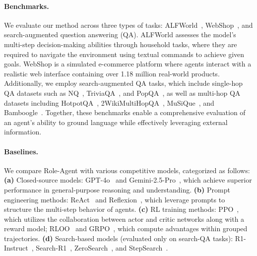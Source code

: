 \documentclass[11pt]{article}
\begin{document}
\paragraph{Benchmarks.} We evaluate our method across three types of tasks: ALFWorld~\cite{shridhar2020alfworld}, WebShop~\cite{yao2022webshop}, and search-augmented question answering (QA). ALFWorld assesses the model's multi-step decision-making abilities through household tasks, where they are required to navigate the environment using textual commands to achieve given goals. WebShop is a simulated e-commerce platform where agents interact with a realistic web interface containing over 1.18 million real-world products. Additionally, we employ search-augmented QA tasks, which include single-hop QA datasets such as NQ~\cite{kwiatkowski2019natural}, TriviaQA~\cite{joshi2017triviaqa}, and PopQA~\cite{mallen2023not}, as well as multi-hop QA datasets including HotpotQA~\cite{yang2018hotpotqa}, 2WikiMultiHopQA~\cite{ho2020constructing}, MuSiQue~\cite{trivedi2022musique}, and Bamboogle~\cite{press2023measuring}. Together, these benchmarks enable a comprehensive evaluation of an agent's ability to ground language while effectively leveraging external information.

\paragraph{Baselines.} We compare Role-Agent with various competitive models, categorized as follows: \textbf{(a)} Closed-source models: GPT-4o~\cite{achiam2023gpt} and Gemini-2.5-Pro~\cite{team2023gemini}, which achieve superior performance in general-purpose reasoning and understanding. \textbf{(b)} Prompt engineering methods: ReAct~\cite{yao2022react} and Reflexion~\cite{shinn2023reflexion}, which leverage prompts to structure the multi-step behavior of agents. \textbf{(c)} RL training methods: PPO~\cite{schulman2017proximal}, which utilizes the collaboration between actor and critic networks along with a reward model; RLOO~\cite{kool2019buy,ahmadian2024back} and GRPO~\cite{guo2025deepseek}, which compute advantages within grouped trajectories. \textbf{(d)} Search-based models (evaluated only on search-QA tasks): R1-Instruct~\cite{jin2025search}, Search-R1~\cite{jin2025search}, ZeroSearch~\cite{sun2025zerosearch}, and StepSearch~\cite{wang2025stepsearch}.
\end{document}
